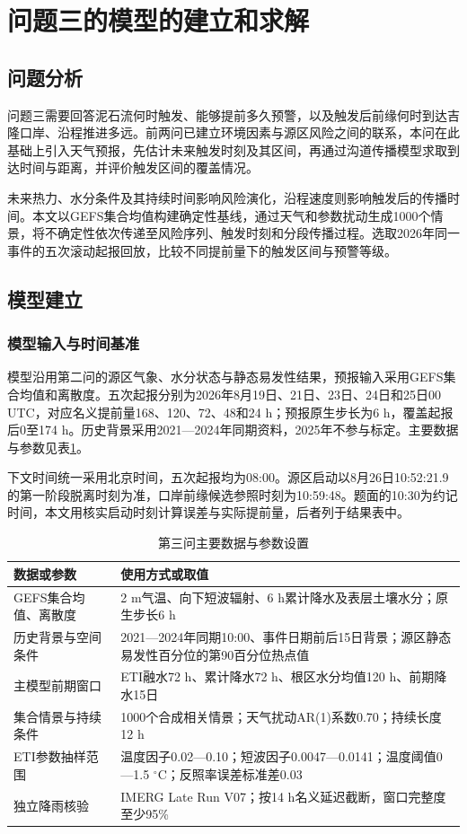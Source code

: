 \section{问题三的模型的建立和求解}
\label{sec:q3}

\subsection{问题分析}
问题三需要回答泥石流何时触发、能够提前多久预警，以及触发后前缘何时到达吉隆口岸、沿程推进多远。前两问已建立环境因素与源区风险之间的联系，本问在此基础上引入天气预报，先估计未来触发时刻及其区间，再通过沟道传播模型求取到达时间与距离，并评价触发区间的覆盖情况。

未来热力、水分条件及其持续时间影响风险演化，沿程速度则影响触发后的传播时间。本文以GEFS集合均值构建确定性基线，通过天气和参数扰动生成1000个情景，将不确定性依次传递至风险序列、触发时刻和分段传播过程。选取2026年同一事件的五次滚动起报回放，比较不同提前量下的触发区间与预警等级。

\subsection{模型建立}
\subsubsection{模型输入与时间基准}
模型沿用第二问的源区气象、水分状态与静态易发性结果，预报输入采用GEFS集合均值和离散度。五次起报分别为2026年8月19日、21日、23日、24日和25日00 UTC，对应名义提前量168、120、72、48和24 h；预报原生步长为6 h，覆盖起报后0至174 h。历史背景采用2021—2024年同期资料，2025年不参与标定。主要数据与参数见表\ref{tab:q3-data}。

下文时间统一采用北京时间，五次起报均为08:00。源区启动以8月26日10:52:21.9的第一阶段脱离时刻为准，口岸前缘候选参照时刻为10:59:48。题面的10:30为约记时间，本文用核实启动时刻计算误差与实际提前量，后者列于结果表中。

\begin{table}[htbp]
  \centering
  \caption{第三问主要数据与参数设置}
  \label{tab:q3-data}
  \begin{tabularx}{\textwidth}{p{3.2cm}X}
    \toprule
    数据或参数 & 使用方式或取值 \\
    \midrule
    GEFS集合均值、离散度 & 2 m气温、向下短波辐射、6 h累计降水及表层土壤水分；原生步长6 h \\
    历史背景与空间条件 & 2021—2024年同期10:00、事件日期前后15日背景；源区静态易发性百分位的第90百分位热点值 \\
    主模型前期窗口 & ETI融水72 h、累计降水72 h、根区水分均值120 h、前期降水15日 \\
    集合情景与持续条件 & 1000个合成相关情景；天气扰动AR(1)系数0.70；持续长度12 h \\
    ETI参数抽样范围 & 温度因子0.02—0.10；短波因子0.0047—0.0141；温度阈值0—1.5 $^\circ$C；反照率误差标准差0.03 \\
    独立降雨核验 & IMERG Late Run V07；按14 h名义延迟截断，窗口完整度至少95\% \\
    \bottomrule
  \end{tabularx}
\end{table}

